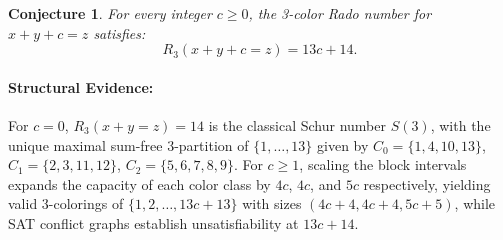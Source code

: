 \documentclass[11pt]{article}
\newtheorem{conjecture}{Conjecture}
\theoremstyle{definition}
\begin{document}
\begin{conjecture}
For every integer $c \ge 0$, the 3-color Rado number for $x + y + c = z$ satisfies:
\begin{equation}
    R_3(x + y + c = z) = 13c + 14.
\end{equation}
\end{conjecture}

\paragraph{Structural Evidence:}
For $c = 0$, $R_3(x+y=z) = 14$ is the classical Schur number $S(3)$, with the unique maximal sum-free 3-partition of $\{1, \dots, 13\}$ given by $C_0 = \{1, 4, 10, 13\}$, $C_1 = \{2, 3, 11, 12\}$, $C_2 = \{5, 6, 7, 8, 9\}$.
For $c \ge 1$, scaling the block intervals expands the capacity of each color class by $4c$, $4c$, and $5c$ respectively, yielding valid 3-colorings of $\{1, 2, \dots, 13c + 13\}$ with sizes $(4c+4, 4c+4, 5c+5)$, while SAT conflict graphs establish unsatisfiability at $13c + 14$.
\end{document}
